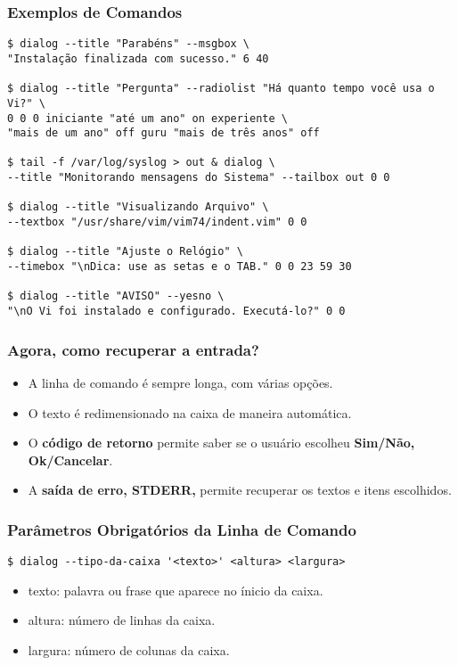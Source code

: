 \documentclass{beamer}
\begin{document}
   \begin{frame}[fragile]
      \frametitle{Exemplos de Comandos}
      \scriptsize
      \begin{verbatim}
$ dialog --title "Parabéns" --msgbox \ 
"Instalação finalizada com sucesso." 6 40
      
$ dialog --title "Pergunta" --radiolist "Há quanto tempo você usa o Vi?" \
0 0 0 iniciante "até um ano" on experiente \
"mais de um ano" off guru "mais de três anos" off 

$ tail -f /var/log/syslog > out & dialog \
--title "Monitorando mensagens do Sistema" --tailbox out 0 0 

$ dialog --title "Visualizando Arquivo" \
--textbox "/usr/share/vim/vim74/indent.vim" 0 0  

$ dialog --title "Ajuste o Relógio" \ 
--timebox "\nDica: use as setas e o TAB." 0 0 23 59 30 

$ dialog --title "AVISO" --yesno \
"\nO Vi foi instalado e configurado. Executá-lo?" 0 0 
      \end{verbatim}
\end{frame}

   \begin{frame}
      \frametitle{Agora, como recuperar a entrada?}
      \begin{itemize}
         \item A linha de comando é sempre longa, com várias opções.
	 \item O texto é redimensionado na caixa de maneira automática.
	 \item O \textbf{código de retorno} permite saber se o usuário escolheu \textbf{Sim/Não, Ok/Cancelar}.
	 \item A \textbf{saída de erro, STDERR,} permite recuperar os textos e itens escolhidos.
      \end{itemize}
   \end{frame}

   \begin{frame}[fragile]
      \frametitle{Parâmetros Obrigatórios da Linha de Comando}
      \begin{verbatim}
$ dialog --tipo-da-caixa '<texto>' <altura> <largura> 
      \end{verbatim}
      \begin{itemize}
         \item texto: palavra ou frase que aparece no ínicio da caixa.
	 \item altura: número de linhas da caixa.
	 \item largura: número de colunas da caixa.
      \end{itemize}
\end{frame}
\end{document}
